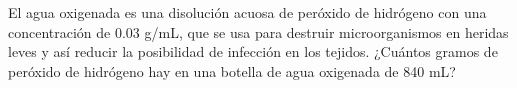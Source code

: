 \question[15] El agua oxigenada es una disolución acuosa de peróxido de hidrógeno con una concentración de 0.03 g/mL,
que se usa para destruir microorganismos en heridas leves y así reducir la posibilidad de infección en los tejidos.
¿Cuántos gramos de peróxido de hidrógeno hay en una botella de agua oxigenada de 840 mL?

\begin{solutionbox}{5cm}

\end{solutionbox}